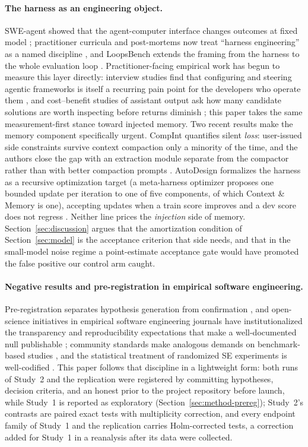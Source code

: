 \documentclass[smallcondensed,natbib]{svjour3}
\begin{document}
\paragraph{The harness as an engineering object.} SWE-agent showed
that the agent-computer interface changes outcomes at fixed model
\citep{yang2024sweagent}; practitioner curricula and post-mortems now
treat ``harness engineering'' as a named discipline
\citep{walkinglabs2026,dex2026wsff}, and LoopsBench extends the framing
from the harness to the whole evaluation loop \citep{li2026loopsbench}.
Practitioner-facing empirical work has begun to measure this layer
directly: interview studies find that configuring and steering agentic
frameworks is itself a recurring pain point for the developers who
operate them \citep{hamid2026hands}, and cost--benefit studies of
assistant output ask how many candidate solutions are worth inspecting
before returns diminish \citep{oertel2025copilot}; this paper takes
the same measurement-first stance toward injected memory.
Two recent results make the memory component specifically urgent.
CompInt quantifies silent \emph{loss}: user-issued side constraints
survive context compaction only a minority of the time, and the
authors close the gap with an extraction module separate from the
compactor rather than with better compaction prompts
\citep{wang2026compint}. AutoDesign formalizes the harness as a
recursive optimization target (a meta-harness optimizer proposes one
bounded update per iteration to one of five components, of which
Context \& Memory is one), accepting updates when a train score
improves and a dev score does not regress \citep{luo2026autodesign}.
Neither line prices the \emph{injection} side of memory.
Section~\ref{sec:discussion} argues that the amortization condition of
Section~\ref{sec:model} is the acceptance criterion that side needs,
and that in the small-model noise regime a point-estimate acceptance
gate would have promoted the false positive our control arm caught.

\paragraph{Negative results and pre-registration in empirical software
engineering.} Pre-registration separates hypothesis generation from
confirmation \citep{nosek2018preregistration}, and open-science
initiatives in empirical software engineering journals have
institutionalized the transparency and reproducibility expectations
that make a well-documented null
publishable \citep{mendez2019openscience}; community standards make
analogous demands on benchmark-based studies \citep{ralph2021standards},
and the statistical treatment of randomized SE experiments is
well-codified \citep{arcuri2011practical}. This paper follows that
discipline in a lightweight form: both runs of Study~2 and the
replication were registered by committing hypotheses, decision
criteria, and an honest prior to the project repository before launch,
while Study~1 is
reported as exploratory (Section~\ref{sec:method-prereg}); Study~2's
contrasts are paired exact tests with multiplicity correction, and
every endpoint family of Study~1 and the replication carries
Holm-corrected tests, a correction added for Study~1 in a reanalysis
after its data were collected.
\end{document}
